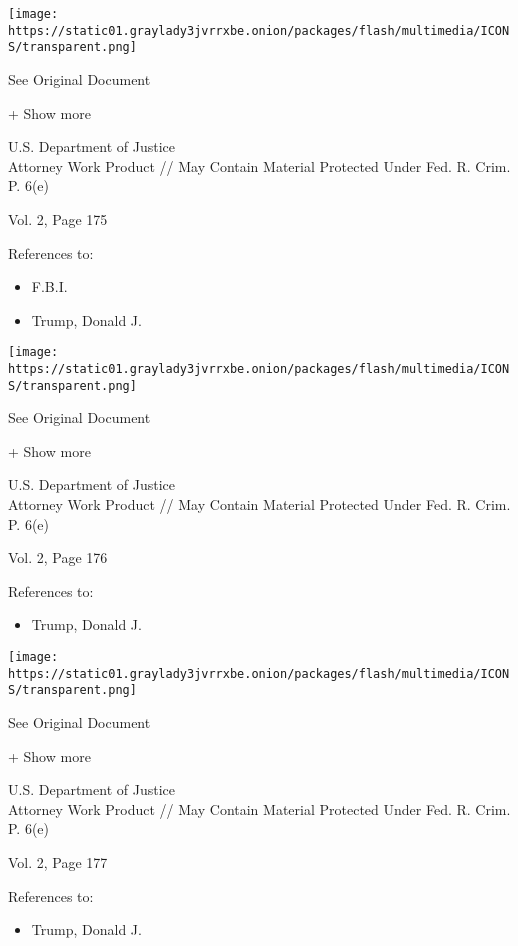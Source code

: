 \texttt{[image: https://static01.graylady3jvrrxbe.onion/packages/flash/multimedia/ICONS/transparent.png]}

See Original Document

+ Show more

U.S. Department of Justice\\
Attorney Work Product // May Contain Material Protected Under Fed. R.
Crim. P. 6(e)

Vol. 2, Page 175

References to:

\begin{itemize}
\tightlist
\item
  F.B.I.
\item
  Trump, Donald J.
\end{itemize}

\protect\hyperlink{}{}

\texttt{[image: https://static01.graylady3jvrrxbe.onion/packages/flash/multimedia/ICONS/transparent.png]}

See Original Document

+ Show more

U.S. Department of Justice\\
Attorney Work Product // May Contain Material Protected Under Fed. R.
Crim. P. 6(e)

Vol. 2, Page 176

References to:

\begin{itemize}
\tightlist
\item
  Trump, Donald J.
\end{itemize}

\protect\hyperlink{}{}

\texttt{[image: https://static01.graylady3jvrrxbe.onion/packages/flash/multimedia/ICONS/transparent.png]}

See Original Document

+ Show more

U.S. Department of Justice\\
Attorney Work Product // May Contain Material Protected Under Fed. R.
Crim. P. 6(e)

Vol. 2, Page 177

References to:

\begin{itemize}
\tightlist
\item
  Trump, Donald J.
\end{itemize}

\protect\hyperlink{}{}

